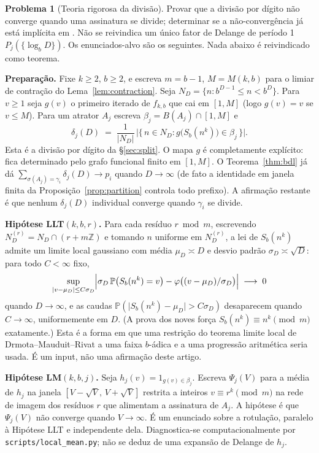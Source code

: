 \documentclass[11pt]{article}
\theoremstyle{definition}
\newtheorem{problem}[theorem]{Problema}
\theoremstyle{remark}
\begin{document}
\begin{problem}[Teoria rigorosa da divisão]\label{prob:split}
Provar que a divisão por dígito não converge quando uma assinatura se divide; determinar se a não-convergência já está implícita em \cite{delange,drmota-poly,drmota-grabner}. Não se reivindica um único fator de Delange de período 1 $P_j(\{\log_b D\})$. Os enunciados-alvo são os seguintes. Nada abaixo é reivindicado como teorema.

\medskip\noindent\textbf{Preparação.} Fixe $k\ge 2$, $b\ge 2$, e escreva $m=b-1$, $M=M(k,b)$ para o limiar de contração do Lema~\ref{lem:contraction}. Seja $N_D=\{n: b^{D-1}\le n<b^D\}$. Para $v\ge 1$ seja $g(v)$ o primeiro iterado de $f_{k,b}$ que cai em $[1,M]$ (logo $g(v)=v$ se $v\le M$). Para um atrator $A_j$ escreva $\beta_j=B(A_j)\cap[1,M]$ e
\[
\delta_j(D)\;=\;\frac1{|N_D|}\,\bigl|\{\,n\in N_D: g\bigl(S_b(n^k)\bigr)\in\beta_j\,\}\bigr|.
\]
Esta é a divisão por dígito da \S\ref{sec:split}. O mapa $g$ é completamente explícito: fica determinado pelo grafo funcional finito em $[1,M]$. O Teorema~\ref{thm:bdl} já dá $\sum_{\sigma(A_j)=\gamma_i}\delta_j(D)\to p_i$ quando $D\to\infty$ (de fato a identidade em janela finita da Proposição~\ref{prop:partition} controla todo prefixo). A afirmação restante é que nenhum $\delta_j(D)$ individual converge quando $\gamma_i$ se divide.

\medskip\noindent\textbf{Hipótese LLT$(k,b,r)$.} Para cada resíduo $r\bmod m$, escrevendo $N_D^{(r)}=N_D\cap(r+m\mathbb{Z})$ e tomando $n$ uniforme em $N_D^{(r)}$, a lei de $S_b(n^k)$ admite um limite local gaussiano com média $\mu_D\asymp D$ e desvio padrão $\sigma_D\asymp\sqrt{D}$: para todo $C<\infty$ fixo,
\[
\sup_{\lvert v-\mu_D\rvert\le C\sigma_D}\Bigl\lvert \sigma_D\,\mathbb{P}\bigl(S_b(n^k)=v\bigr)-\varphi\bigl((v-\mu_D)/\sigma_D\bigr)\Bigr\rvert\;\longrightarrow\;0
\]
quando $D\to\infty$, e as caudas $\mathbb{P}(\lvert S_b(n^k)-\mu_D\rvert>C\sigma_D)$ desaparecem quando $C\to\infty$, uniformemente em $D$. (A prova dos noves força $S_b(n^k)\equiv n^k\pmod m$ exatamente.) Esta é a forma em que uma restrição do teorema limite local de Drmota--Mauduit--Rivat \cite{dmr} a uma faixa $b$-ádica e a uma progressão aritmética seria usada. É um input, não uma afirmação deste artigo.

\medskip\noindent\textbf{Hipótese LM$(k,b,j)$.} Seja $h_j(v)=1_{g(v)\in\beta_j}$. Escreva $\Psi_j(V)$ para a média de $h_j$ na janela $[V-\sqrt{V},\,V+\sqrt{V}]$ restrita a inteiros $v \equiv r^k \pmod m$ na rede de imagem dos resíduos $r$ que alimentam a assinatura de $A_j$. A hipótese é que $\Psi_j(V)$ não converge quando $V\to\infty$. É um enunciado sobre a rotulação, paralelo à Hipótese LLT e independente dela. Diagnostica-se computacionalmente por \texttt{scripts/local\_mean.py}; não se deduz de uma expansão de Delange de $h_j$.


\end{problem}
\end{document}
